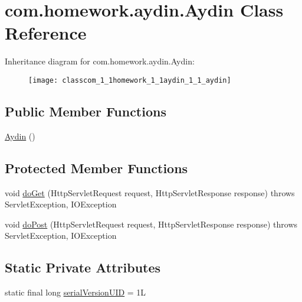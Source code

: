 \hypertarget{classcom_1_1homework_1_1aydin_1_1_aydin}{}\section{com.\+homework.\+aydin.\+Aydin Class Reference}
\label{classcom_1_1homework_1_1aydin_1_1_aydin}
Inheritance diagram for com.\+homework.\+aydin.\+Aydin\+:\begin{figure}[H]
\begin{center}
\leavevmode
\texttt{[image: classcom\_1\_1homework\_1\_1aydin\_1\_1\_aydin]}
\end{center}
\end{figure}
\subsection*{Public Member Functions}
\begin{DoxyCompactItemize}
\item 
\hyperlink{classcom_1_1homework_1_1aydin_1_1_aydin_a2ede141d77b6e437e10f3da056d7f116}{Aydin} ()
\end{DoxyCompactItemize}
\subsection*{Protected Member Functions}
\begin{DoxyCompactItemize}
\item 
void \hyperlink{classcom_1_1homework_1_1aydin_1_1_aydin_a307f64d407db1b6402d28ffaea0370a9}{do\+Get} (Http\+Servlet\+Request request, Http\+Servlet\+Response response)  throws Servlet\+Exception, I\+O\+Exception 
\item 
void \hyperlink{classcom_1_1homework_1_1aydin_1_1_aydin_af8469a95252334d3e3b350bcae6e7e1f}{do\+Post} (Http\+Servlet\+Request request, Http\+Servlet\+Response response)  throws Servlet\+Exception, I\+O\+Exception 
\end{DoxyCompactItemize}
\subsection*{Static Private Attributes}
\begin{DoxyCompactItemize}
\item 
static final long \hyperlink{classcom_1_1homework_1_1aydin_1_1_aydin_a36327d610cbc4ac41f7c9f3bf5589f23}{serial\+Version\+U\+ID} = 1L
\end{DoxyCompactItemize}


